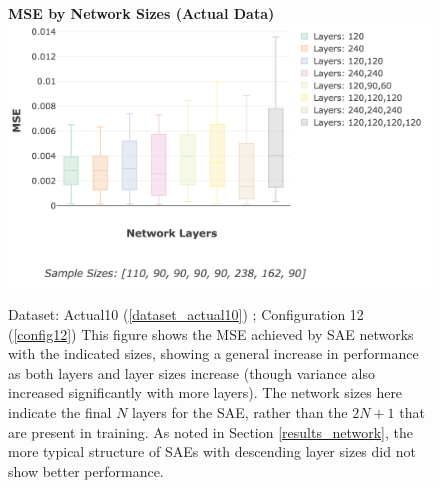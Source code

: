\documentclass[a4paper,11pt,oneside]{article}
\theoremstyle{plain}
\theoremstyle{definition}
\begin{document}
	\begin{figure}[H]
		\centering 
		\textbf{MSE by Network Sizes (Actual Data)}
		\includegraphics[scale=0.4]{images/results/8_appendix/actual_sae_mse_box.png} 
		\caption[MSE By Network Sizes (Actual Data)]{Dataset: Actual10 (\ref{dataset_actual10}) ; Configuration 12 (\ref{config12})
			\newline This figure shows the MSE achieved by SAE networks with the indicated sizes, showing a general increase in performance as both layers and layer sizes increase (though variance also increased significantly with more layers). The network sizes here indicate the final $N$ layers for the SAE, rather than the $2N + 1$ that are present in training. As noted in Section \ref{results_network}, the more typical structure of SAEs with descending layer sizes did not show better performance.}
		\label{figure-actual_sae_mse_box}
	\end{figure}
	
\end{document}
